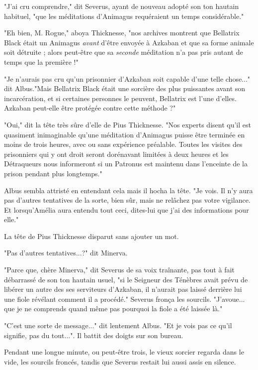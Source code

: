 "J'ai cru comprendre," dit Severus, ayant de nouveau adopté son ton hautain habituel, "que les méditations d'Animagus requéraient un temps considérable."

"Eh bien, M. Rogue," aboya Thicknesse, "nos archives montrent que Bellatrix Black était un Animagus \emph{avant}  d'être envoyée à Azkaban et que sa forme animale soit détruite ; alors peut-être que sa \emph{seconde}  méditation n'a pas pris autant de temps que la première !"

"Je n'aurais pas cru qu'un prisonnier d'Azkaban soit capable d'une telle chose..." dit Albus."Mais Bellatrix Black était une sorcière des plus puissantes avant son incarcération, et si certaines personnes le peuvent, Bellatrix est l'une d'elles. Azkaban peut-elle être protégée contre cette méthode ?"

"Oui," dit la tête très sûre d'elle de Pius Thicknesse. "Nos experts disent qu'il est quasiment inimaginable qu'une méditation d'Animagus puisse être terminée en moins de trois heures, avec ou sans expérience préalable. Toutes les visites des prisonniers qui y ont droit seront dorénavant limitées à deux heures et les Détraqueurs nous informeront si un Patronus est maintenu dans l'enceinte de la prison pendant plus longtemps."

Albus sembla attristé en entendant cela mais il hocha la tête. "Je vois. Il n'y aura pas d'autres tentatives de la sorte, bien sûr, mais ne relâchez pas votre vigilance. Et lorsqu'Amélia aura entendu tout ceci, dites-lui que j'ai des informations pour elle."

La tête de Pius Thicknesse disparut sans ajouter un mot.

"Pas d'autres tentatives...?" dit Minerva.

"Parce que, chère Minerva," dit Severus de sa voix traînante, pas tout à fait débarrassé de son ton hautain usuel, "si le Seigneur des Ténèbres avait prévu de libérer un autre des ses serviteurs d'Azkaban, il n'aurait pas laissé derrière lui une fiole révélant comment il a procédé." Severus fronça les sourcils. "J'avoue... que je ne comprends quand même pas pourquoi la fiole a été laissée là."

"C'est une sorte de message..." dit lentement Albus. "Et je vois pas ce qu'il signifie, pas du tout...". Il battit des doigts sur son bureau.

Pendant une longue minute, ou peut-être trois, le vieux sorcier regarda dans le vide, les sourcils froncés, tandis que Severus restait lui aussi assis en silence.

